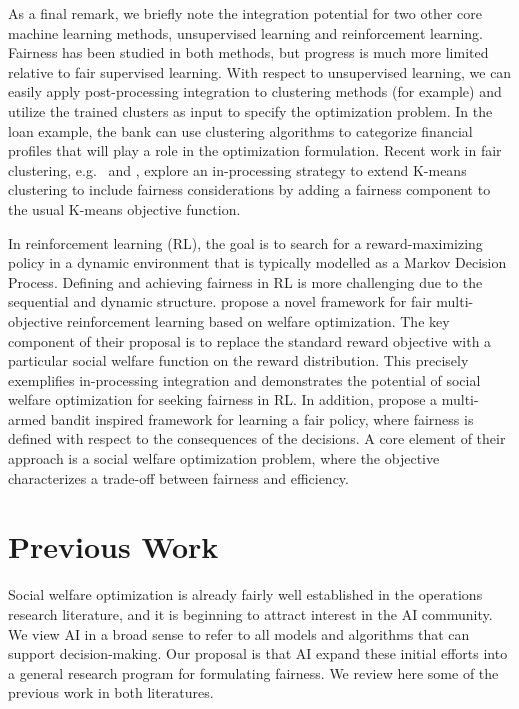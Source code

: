 \documentclass{article}[11pt]
\begin{document}
As a final remark, we briefly note the integration potential for two other core machine learning methods, unsupervised learning and reinforcement learning. Fairness has been studied in both methods, but progress is much more limited relative to fair supervised learning. With respect to unsupervised learning, we can easily apply post-processing integration to clustering methods (for example) and utilize the trained clusters as input to specify the optimization problem. In the loan example, the bank can use clustering algorithms to categorize financial profiles that will play a role in the optimization formulation. Recent work in fair clustering, e.g.\ \cite{abraham2019faircluster} and \cite{deepak2020representativity}, explore an in-processing strategy to extend K-means clustering to include fairness considerations by adding a fairness component to the usual K-means objective function. 

In reinforcement learning (RL), the goal is to search for a reward-maximizing policy in a dynamic environment that is typically modelled as a Markov Decision Process. Defining and achieving fairness in RL is more challenging due to the sequential and dynamic structure. \cite{weng2019RLfairness,siddique2020fairRL} propose a novel framework for fair multi-objective reinforcement learning based on welfare optimization. The key component of their proposal is to replace the standard reward objective with a particular social welfare function on the reward distribution. This precisely exemplifies in-processing integration and demonstrates the potential of social welfare optimization for seeking fairness in RL. In addition, \cite{chohlas2021learning} propose a multi-armed bandit inspired framework for learning a fair policy, where fairness is defined with respect to the consequences of the decisions. A core element of their approach is a social welfare optimization problem, where the objective characterizes a trade-off between fairness and efficiency.



\section{Previous Work} \label{sec:util-swf}
Social welfare optimization is already fairly well established in the operations research literature, and it is beginning to attract interest in the AI community. We view AI in a broad sense to refer to all models and algorithms that can support decision-making. Our proposal is that AI expand these initial efforts into a general research program for formulating fairness.  We review here some of the previous work in both literatures. 
\end{document}
